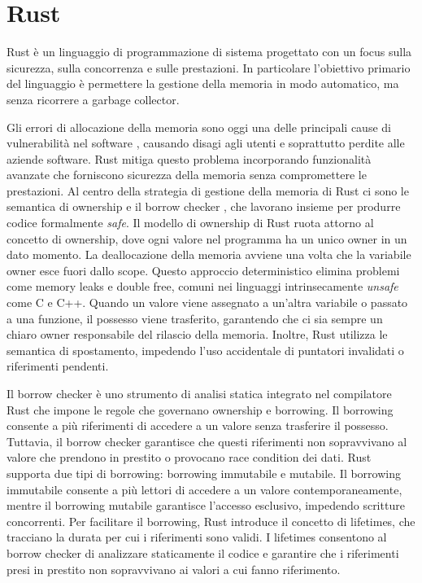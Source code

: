 \section[Rust]{Rust}

Rust è un linguaggio di programmazione di sistema progettato con un focus sulla sicurezza, sulla concorrenza e sulle prestazioni. In particolare l'obiettivo primario del linguaggio è permettere la gestione della memoria in modo automatico, ma senza ricorrere a garbage collector. 

Gli errori di allocazione della memoria sono oggi una delle principali cause di vulnerabilità nel software \cite[]{Mic:memory_safety}, causando disagi agli utenti e soprattutto perdite alle aziende software. Rust mitiga questo problema incorporando funzionalità avanzate che forniscono sicurezza della memoria senza compromettere le prestazioni. Al centro della strategia di gestione della memoria di Rust ci sono le semantica di ownership e il borrow checker \cite[]{Rust:borrow_checker}, che lavorano insieme per produrre codice formalmente \textit{safe}. Il modello di ownership di Rust ruota attorno al concetto di ownership, dove ogni valore nel programma ha un unico owner in un dato momento. La deallocazione della memoria avviene una volta che la variabile owner esce fuori dallo scope. Questo approccio deterministico elimina problemi come memory leaks e double free, comuni nei linguaggi intrinsecamente \textit{unsafe} come C e C++. Quando un valore viene assegnato a un'altra variabile o passato a una funzione, il possesso viene trasferito, garantendo che ci sia sempre un chiaro owner responsabile del rilascio della memoria. Inoltre, Rust utilizza le semantica di spostamento, impedendo l'uso accidentale di puntatori invalidati o riferimenti pendenti.

Il borrow checker è uno strumento di analisi statica integrato nel compilatore Rust che impone le regole che governano ownership e borrowing. Il borrowing consente a più riferimenti di accedere a un valore senza trasferire il possesso. Tuttavia, il borrow checker garantisce che questi riferimenti non sopravvivano al valore che prendono in prestito o provocano race condition dei dati. Rust supporta due tipi di borrowing: borrowing immutabile e mutabile. Il borrowing immutabile consente a più lettori di accedere a un valore contemporaneamente, mentre il borrowing mutabile garantisce l'accesso esclusivo, impedendo scritture concorrenti. Per facilitare il borrowing, Rust introduce il concetto di lifetimes, che tracciano la durata per cui i riferimenti sono validi. I lifetimes consentono al borrow checker di analizzare staticamente il codice e garantire che i riferimenti presi in prestito non sopravvivano ai valori a cui fanno riferimento.

